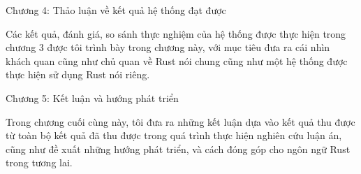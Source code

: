 Chương 4: Thảo luận về kết quả hệ thống đạt được

Các kết quả, đánh giá, so sánh thực nghiệm của hệ thống được thực hiện trong chương 3 được tôi trình bày trong chương này, với mục tiêu đưa ra cái nhìn khách quan cũng như chủ quan về Rust nói chung cũng như một hệ thống được thực hiện sử dụng Rust nói riêng.

Chương 5: Kết luận và hướng phát triển

Trong chương cuối cùng này, tôi đưa ra những kết luận dựa vào kết quả thu được từ toàn bộ kết quả đã thu được trong quá trình thực hiện nghiên cứu luận án, cũng như đề xuất những hướng phát triển, và cách đóng góp cho ngôn ngữ Rust trong tương lai.
